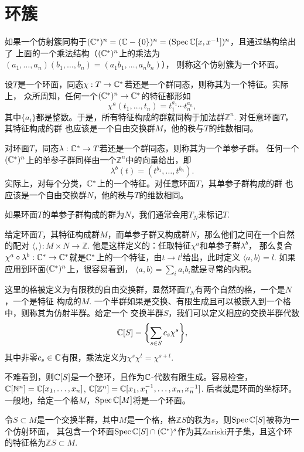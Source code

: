 \chapter{环簇}

\para[环面] 如果一个仿射簇同构于$(\mathbb{C}^*)^n=(\mathbb{C}-\{0\})^n=(\operatorname{Spec}\mathbb{C}[x,x^{-1}])^n$，且通过结构给出了
上面的一个乘法结构（$(\mathbb{C}^*)^n$上的乘法为$(a_1,\dots,a_n)(b_1,\dots,b_n)=(a_1b_1,\dots,a_n b_n)$），
则称这个仿射簇为一个环面。

\para[特征] 设$T$是一个环面，同态$\chi:T\to \mathbb{C}^*$若还是一个群同态，则称其为一个特征。实际上，
众所周知，任何一个$(\mathbb{C}^*)^n\to \mathbb{C}^*$的特征都形如
\[
    \chi^a(t_1,\dots,t_n)=t_1^{a_1}\cdots t_n^{a_n},
\]
其中$\{a_i\}$都是整数。于是，所有特征构成的群就同构于加法群$\mathbb Z^n$. 对任意环面$T$，其特征构成的群
也应该是一个自由交换群$M$，他的秩与$T$的维数相同。

\para[单参子群] 对环面$T$，同态$\lambda:\mathbb{C}^*\to T$若还是一个群同态，则称其为一个单参子群。
任何一个$(\mathbb{C}^*)^n$上的单参子群同样由一个$\mathbb Z^n$中的向量给出，即
\[
    \lambda^b(t)=(t^{b_1},\dots,t^{b_n}).
\]
实际上，对每个分类，$\mathbb{C}^*$上的一个特征。对任意环面$T$，其单参子群构成的群
也应该是一个自由交换群$N$，他的秩与$T$的维数相同。

如果环面$T$的单参子群构成的群为$N$，我们通常会用$T_N$来标记$T$.

\para 给定环面$T$，其特征构成群$M$，而单参子群又构成群$N$，那么他们之间在一个自然的配对
$\langle ,\rangle:M\times N\to \mathbb{Z}$. 他是这样定义的：任取特征$\chi^a$和单参子群$\lambda^b$，
那么复合$\chi^a\circ\lambda^b:\mathbb{C}^*\to \mathbb{C}^*$就是$\mathbb{C}^*$上的一个特征，由$t\to t^l$给出，此时定义
$\langle a,b\rangle=l$. 如果应用到环面$(\mathbb{C}^*)^n$上，很容易看到，
$\langle a,b\rangle=\sum_{i}a_ib_i$就是寻常的内积。

\para[格与仿射半群] 这里的格被定义为有限秩的自由交换群，显然环面$T_N$有两个自然的格，一个是$N$，一个是特征
构成的$M$. 一个半群如果是交换、有限生成且可以被嵌入到一个格中，则称其为仿射半群。给定一个
交换半群$S$，我们可以定义相应的交换半群代数
\[
    \mathbb{C}[S]=\biggl\{\sum_{s\in S}c_s \chi^s\biggr\},
\]
其中非零$c_s\in \mathbb{C}$有限，乘法定义为$\chi^s\chi^t=\chi^{s+t}$.

不难看到，则$\mathbb{C}[S]$是一个整环，且作为$\mathbb{C}$-代数有限生成。容易检查，
$\mathbb{C}[\mathbb N^n]=\mathbb{C}[x_1,\dots,x_n]$, $\mathbb{C}[\mathbb Z^n]=\mathbb{C}[x_1,x_1^{-1},\dots,x_n,x_n^{-1}]$. 
后者就是环面的坐标环。一般地，给定一个格$M$，$\operatorname{Spec} \mathbb{C}[M]$将是一个环面。

\para[仿射环面] 令$S\subset M$是一个交换半群，其中$M$是一个格，格$\mathbb ZS$的秩为$s$，则$\operatorname{Spec} \mathbb{C}[S]$被称为一个仿射环面，
其包含一个环面$\operatorname{Spec} \mathbb{C}[S]\cap (\mathbb{C}^*)^s$作为其Zariski开子集，且这个环的特征格为$\mathbb ZS\subset M$.

